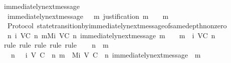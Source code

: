 \begin{isabellebody}
\endisatagproof
{\isafoldproof}%
%
\isadelimproof
\isanewline
%
\endisadelimproof
\isanewline
\isanewline
{}\isamarkupfalse%
\ immediately{\isacharunderscore}next{\isacharunderscore}message\ \isanewline
\ \ {\isachardoublequoteopen}immediately{\isacharunderscore}next{\isacharunderscore}message\ {\isacharequal}\ {\isacharparenleft}{\isasymlambda}{\isacharparenleft}{\isasymsigma}{\isacharcomma}\ m{\isacharparenright}{\isachardot}\ justification\ m\ {\isasymsubseteq}\ {\isasymsigma}\ {\isasymand}\ m\ {\isasymnotin}\ {\isasymsigma}{\isacharparenright}{\isachardoublequoteclose}\isanewline
\isanewline
{}\isamarkupfalse%
\ {\isacharparenleft}\ Protocol{\isacharparenright}\ state{\isacharunderscore}transition{\isacharunderscore}by{\isacharunderscore}immediately{\isacharunderscore}next{\isacharunderscore}message{\isacharunderscore}of{\isacharunderscore}same{\isacharunderscore}depth{\isacharunderscore}non{\isacharunderscore}zero{\isacharcolon}\ \isanewline
\ \ {\isachardoublequoteopen}{\isasymforall}n{\isasymge}{}{\isachardot}\ {\isasymforall}{\isasymsigma}{\isasymin}{\isasymSigma}i\ {\isacharparenleft}V{\isacharcomma}C{\isacharcomma}{\isasymepsilon}{\isacharparenright}\ n{\isachardot}\ {\isasymforall}m{\isasymin}Mi\ {\isacharparenleft}V{\isacharcomma}C{\isacharcomma}{\isasymepsilon}{\isacharparenright}\ n{\isachardot}\ immediately{\isacharunderscore}next{\isacharunderscore}message\ {\isacharparenleft}{\isasymsigma}{\isacharcomma}m{\isacharparenright}\ {\isasymlongrightarrow}\ {\isasymsigma}\ {\isasymunion}\ {\isacharbraceleft}m{\isacharbraceright}\ {\isasymin}\ {\isasymSigma}i\ {\isacharparenleft}V{\isacharcomma}C{\isacharcomma}{\isasymepsilon}{\isacharparenright}\ {\isacharparenleft}n{\isacharplus}{}{\isacharparenright}{\isachardoublequoteclose}\isanewline
%
\isadelimproof
\ \ %
\endisadelimproof
%
\isatagproof
{}\isamarkupfalse%
\ {\isacharparenleft}rule{\isacharcomma}\ rule{\isacharcomma}\ rule{\isacharcomma}\ rule{\isacharcomma}\ rule{\isacharparenright}\isanewline
{}\isamarkupfalse%
{\isacharminus}\isanewline
\ \ \isamarkupfalse%
\ n\ {\isasymsigma}\ m\isanewline
\ \ \isamarkupfalse%
\ {\isachardoublequoteopen}{}\ {\isasymle}\ n{\isachardoublequoteclose}\ {\isachardoublequoteopen}{\isasymsigma}\ {\isasymin}\ {\isasymSigma}i\ {\isacharparenleft}V{\isacharcomma}\ C{\isacharcomma}\ {\isasymepsilon}{\isacharparenright}\ n{\isachardoublequoteclose}\ {\isachardoublequoteopen}m\ {\isasymin}\ Mi\ {\isacharparenleft}V{\isacharcomma}\ C{\isacharcomma}\ {\isasymepsilon}{\isacharparenright}\ n{\isachardoublequoteclose}\ {\isachardoublequoteopen}immediately{\isacharunderscore}next{\isacharunderscore}message\ {\isacharparenleft}{\isasymsigma}{\isacharcomma}\ m{\isacharparenright}{\isachardoublequoteclose}\isanewline

\end{isabellebody}
